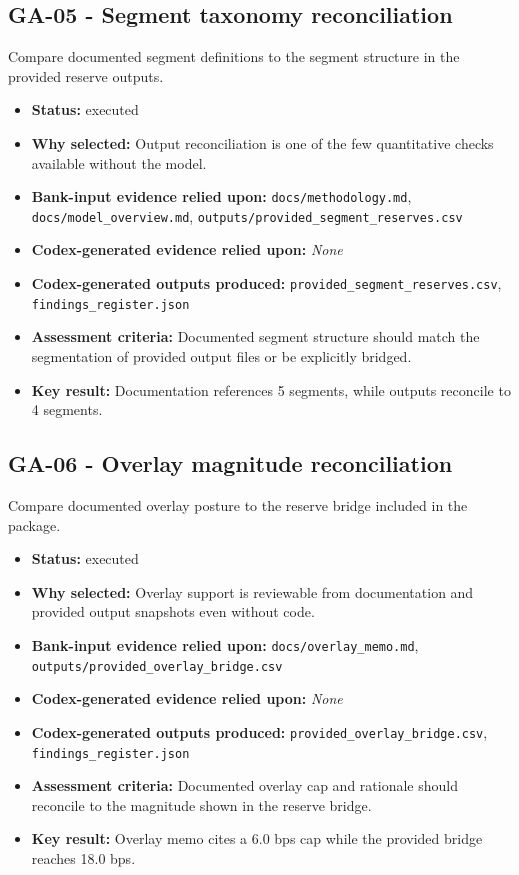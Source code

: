\documentclass[11pt]{article}
\begin{document}
\subsection*{GA-05 - Segment taxonomy reconciliation}
Compare documented segment definitions to the segment structure in the provided reserve outputs.
\begin{itemize}
\item \textbf{Status:} executed
\item \textbf{Why selected:} Output reconciliation is one of the few quantitative checks available without the model.
\item \textbf{Bank-input evidence relied upon:} \texttt{docs/methodology.md}, \texttt{docs/model\_overview.md}, \texttt{outputs/provided\_segment\_reserves.csv}
\item \textbf{Codex-generated evidence relied upon:} \textit{None}
\item \textbf{Codex-generated outputs produced:} \texttt{provided\_segment\_reserves.csv}, \texttt{findings\_register.json}
\item \textbf{Assessment criteria:} Documented segment structure should match the segmentation of provided output files or be explicitly bridged.
\item \textbf{Key result:} Documentation references 5 segments, while outputs reconcile to 4 segments.
\end{itemize}
\subsection*{GA-06 - Overlay magnitude reconciliation}
Compare documented overlay posture to the reserve bridge included in the package.
\begin{itemize}
\item \textbf{Status:} executed
\item \textbf{Why selected:} Overlay support is reviewable from documentation and provided output snapshots even without code.
\item \textbf{Bank-input evidence relied upon:} \texttt{docs/overlay\_memo.md}, \texttt{outputs/provided\_overlay\_bridge.csv}
\item \textbf{Codex-generated evidence relied upon:} \textit{None}
\item \textbf{Codex-generated outputs produced:} \texttt{provided\_overlay\_bridge.csv}, \texttt{findings\_register.json}
\item \textbf{Assessment criteria:} Documented overlay cap and rationale should reconcile to the magnitude shown in the reserve bridge.
\item \textbf{Key result:} Overlay memo cites a 6.0 bps cap while the provided bridge reaches 18.0 bps.
\end{itemize}
\end{document}
